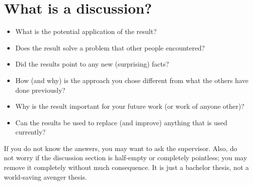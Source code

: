 \section{What is a discussion?}
\begin{itemize}
\item What is the potential application of the result?
\item Does the result solve a problem that other people encountered?
\item Did the results point to any new (surprising) facts?
\item How (and why) is the approach you chose different from what the others have done previously?
\item Why is the result important for your future work (or work of anyone other)?
\item Can the results be used to replace (and improve) anything that is used currently?
\end{itemize}

If you do not know the answers, you may want to ask the supervisor. Also, do not worry if the discussion section is half-empty or completely pointless; you may remove it completely without much consequence. It is just a bachelor thesis, not a world-saving avenger thesis.
